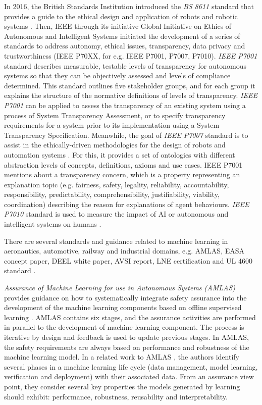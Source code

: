 In 2016, the British Standards Institution introduced the \textit{BS 8611} standard that provides a guide to the ethical design and application of robots and robotic systems \cite{BS8611}. 
Then, IEEE through its initiative Global Initiative on Ethics of Autonomous and Intelligent Systems initiated the development of a series of standards to address autonomy, ethical issues, transparency, data privacy and trustworthiness (IEEE P70XX, for e.g. IEEE P7001, P7007, P7010). 
\textit{IEEE P7001} standard describes measurable, testable levels of transparency for autonomous systems so that they can be objectively assessed and levels of compliance determined\cite{IEEE-P7001}. 
This standard outlines five stakeholder groups, and for each group it explains the structure of the normative definitions of levels of transparency. 
\textit{IEEE P7001} can be applied to assess the transparency of an existing system using a process of System Transparency Assessment, or to specify transparency requirements for a system prior to its implementation using a System Transparency Specification.
Meanwhile, the goal of \textit{IEEE P7007} standard is to assist in the ethically-driven methodologies for the design of robots and automation systems \cite{IEEE-P7007}.
For this, it provides a set of ontologies with different abstraction levels of concepts, definitions, axioms and use cases. 
IEEE P7001 mentions about a transparency concern, which is a property representing an explanation topic (e.g. fairness, safety, legality, reliability, accountability, responsibility, predictability, comprehensibility, justifiability, viability, coordination) describing the reason for explanations of agent behaviours. 
\textit{IEEE P7010} standard is used to measure the impact of AI or autonomous and intelligent systems on humans \cite{IEEE-P7010}. 

There are several standards and guidance related to machine learning in aeronautics, automotive, railway and industrial domains, e.g. AMLAS, EASA concept paper, DEEL white paper, AVSI report, LNE certification and UL 4600 standard \cite{Kaakai2022}.

\textit{Assurance of Machine Learning for use in Autonomous Systems (AMLAS)} provides guidance on how to systematically integrate safety assurance into the development of the machine learning components based on offline supervised learning \cite{Hawkins2021}. 
AMLAS contains six stages, and the assurance activities are performed in parallel to the development of machine learning component. 
The process is iterative by design and feedback is used to update previous stages. 
In AMLAS, the safety requirements are always based on performance and robustness of the machine learning model. 
In a related work to AMLAS \cite{Ashmore2021}, the authors identify several phases in a machine learning life cycle (data management, model learning, verification and deployment) with their associated data. From an assurance view point, they consider several key properties the models generated by learning should exhibit: performance, robustness, reusability and interpretability.%

